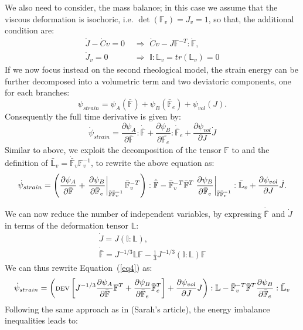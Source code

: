 \documentclass[12pt]{extarticle}
\newcommand{\F}{\ensuremath{\mathbb{F}}}
\newcommand{\LL}{\ensuremath{\mathbb{L}}}
\begin{document}
We also need to consider, the mass balance; in this case we assume that the viscous deformation is isochoric, i.e. $\det(\F_v)=J_v=1$, so that, the additional condition are:
\begin{equation}
 \begin{aligned}
 \dot{J} - \dot{C}v=0&\,\,\Longrightarrow\,\,\dot{C}v-J\F^{-T}:\dot{\F},\\
 \dot{J}_v=0 &\,\,\Longrightarrow \,\,\mathbb{I}:\LL_v=tr(\LL_v)=0
 \end{aligned}
\end{equation}
If we now focus instead on the second rheological model, the strain energy can be further decomposed into a volumetric term and two deviatoric components, one for each branches:
\begin{equation}
\psi_{strain}=\psi_{A}(\bar{\F})+\psi_{B}(\bar{\F}_e)+ \psi_{vol}(J).
\end{equation}
Consequently the full time derivative is given by:
\begin{equation}
\dot{\psi}_{strain}= \frac{\partial \psi_A}{\partial \bar{\F}}:\dot{\bar{\F}} +  \frac{\partial \psi_B}{\partial \bar{\F_e}}:\dot{\bar{\F}}_e + \frac{\partial \psi_{vol}}{\partial J} \dot{J}
\end{equation}
Similar to above, we exploit the decomposition of the tensor $\F$ to and the definition of $\bar{\LL}_v= \dot{\bar{\F}}_v\F_v^{-1}$, to rewrite the above equation as:
\begin{equation}
\scriptsize
\dot{\psi}_{strain}=\left(\frac{\partial \psi_A}{\partial \bar{\F}}+  \left.\frac{\partial \psi_B}{\partial \bar{\F}_e}\right|_{\bar{\F}\bar{\F}_v^{-1}}\bar{\F}_v^{-T}\right):\dot{\bar{\F}}-\bar{\F}_v^{-T}\bar{\F}^T\left.\frac{\partial \psi_B}{\partial \bar{\F}_e}\right|_{\bar{\F}\bar{\F}_v^{-1}}:\bar{\LL}_v + \frac{\partial \psi_{vol}}{\partial J} \dot{J}. \label{eq4}
\end{equation}

We can now reduce the number of independent variables, by expressing $\dot{\bar{\F}}$ and $\dot{J}$ in terms of the deformation tensor $\LL$:
\begin{gather}
\dot{J} = J (\mathbb{I}:\LL),\\
\dot{\bar{\F}} = J^{-1/3} \LL \F - \frac{1}{3} J^{-1/3} (\mathbb{I}:\LL) \F 
\end{gather}
We can thus rewrite Equation~(\ref{eq4}) as:
\begin{equation}
\scriptsize
\dot{\psi}_{strain} = \left( \text{DEV} \left[J^{-1/3}\frac{\partial \psi_A}{\partial \bar{\F}}\F^T+ \frac{\partial \psi_B}{\partial \bar{\F}_e}\bar{\F}_e^{T}\right]+\frac{\partial \psi_{vol}}{\partial J} J\right) : \LL -\bar{\F}_v^{-T}\bar{\F}^T\frac{\partial \psi_B}{\partial \bar{\F}_e}:\bar{\LL}_v
\end{equation}
Following the same approach as in (Sarah's article), the energy imbalance inequalities leads to:
\end{document}
